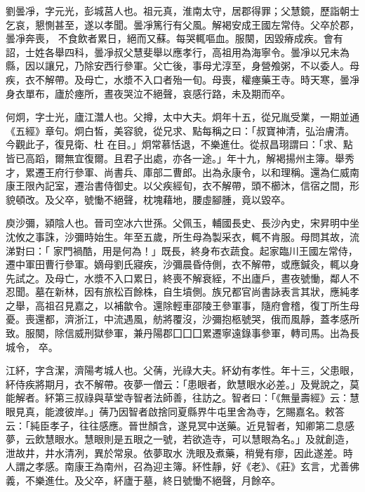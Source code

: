 \begin{pinyinscope}
 劉曇凈，字元光，彭城莒人也。祖元真，淮南太守，居郡得罪；父慧鏡，歷詣朝士乞哀，懇惻甚至，遂以孝聞。曇凈篤行有父風。解褐安成王國左常侍。父卒於郡，曇凈奔喪，
 不食飲者累日，絕而又蘇。每哭輒嘔血。服闋，因毀瘠成疾。會有詔，士姓各舉四科，曇凈叔父慧斐舉以應孝行，高祖用為海寧令。曇凈以兄未為縣，因以讓兄，乃除安西行參軍。父亡後，事母尤淳至，身營飧粥，不以委人。母疾，衣不解帶。及母亡，水漿不入口者殆一旬。母喪，權瘞藥王寺。時天寒，曇凈身衣單布，廬於瘞所，晝夜哭泣不絕聲，哀感行路，未及期而卒。



 何炯，字士光，廬江灊人也。父撙，太中大夫。炯年十五，從兄胤受業，一期並通《五經》章句。炯白皙，美容貌，從兄求、點每稱之曰：「叔寶神清，弘治膚清。今觀此子，復見衛、杜
 在目。」炯常慕恬退，不樂進仕。從叔昌珝謂曰：「求、點皆已高蹈，爾無宜復爾。且君子出處，亦各一途。」年十九，解褐揚州主簿。舉秀才，累遷王府行參軍、尚書兵、庫部二曹郎。出為永康令，以和理稱。還為仁威南康王限內記室，遷治書侍御史。以父疾經旬，衣不解帶，頭不櫛沐，信宿之間，形貌頓改。及父卒，號慟不絕聲，枕塊藉地，腰虛腳腫，竟以毀卒。



 庾沙彌，潁陰人也。晉司空冰六世孫。父佩玉，輔國長史、長沙內史，宋昇明中坐沈攸之事誅，沙彌時始生。年至五歲，所生母為製采衣，輒不肯服。母問其故，流涕對曰：「
 家門禍酷，用是何為！」既長，終身布衣蔬食。起家臨川王國左常侍，遷中軍田曹行參軍。嫡母劉氏寢疾，沙彌晨昏侍側，衣不解帶，或應鍼灸，輒以身先試之。及母亡，水漿不入口累日，終喪不解衰絰，不出廬戶，晝夜號慟，鄰人不忍聞。墓在新林，因有旅松百餘株，自生墳側。族兄都官尚書詠表言其狀，應純孝之舉，高祖召見嘉之，以補歙令。還除輕車邵陵王參軍事，隨府會稽，復丁所生母憂。喪還都，濟浙江，中流遇風，舫將覆沒，沙彌抱柩號哭，俄而風靜，蓋孝感所致。服闋，除信威刑獄參軍，兼丹陽郡囗囗囗累遷寧遠錄事參軍，轉司馬。出為長城令，
 卒。



 江紑，字含潔，濟陽考城人也。父蒨，光祿大夫。紑幼有孝性。年十三，父患眼，紑侍疾將期月，衣不解帶。夜夢一僧云：「患眼者，飲慧眼水必差。」及覺說之，莫能解者。紑第三叔祿與草堂寺智者法師善，往訪之。智者曰：「《無量壽經》云：慧眼見真，能渡彼岸。」蒨乃因智者啟捨同夏縣界牛屯里舍為寺，乞賜嘉名。敕答云：「純臣孝子，往往感應。晉世顏含，遂見冥中送藥。近見智者，知卿第二息感夢，云飲慧眼水。慧眼則是五眼之一號，若欲造寺，可以慧眼為名。」及就創造，泄故井，井水清冽，異於常泉。依夢取水
 洗眼及煮藥，稍覺有瘳，因此遂差。時人謂之孝感。南康王為南州，召為迎主簿。紑性靜，好《老》、《莊》玄言，尤善佛義，不樂進仕。及父卒，紑廬于墓，終日號慟不絕聲，月餘卒。




\end{pinyinscope}
